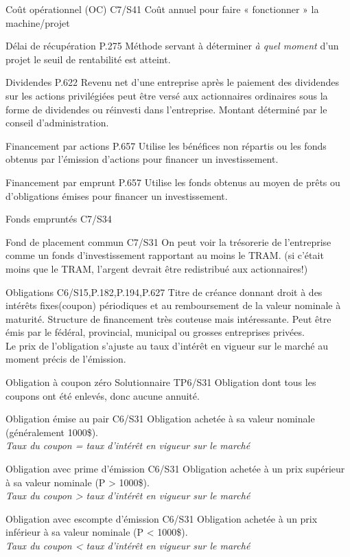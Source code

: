 {\entry
{Coût opérationnel (OC)}
{C7/S41}
{Coût annuel pour faire « fonctionner » la machine/projet}

\entry
{Délai de récupération}
{P.275}
{Méthode servant à déterminer \textit{à quel moment} d'un projet le seuil de rentabilité est atteint.}

\entry
{Dividendes}
{P.622}
{Revenu net d'une entreprise après le paiement des dividendes sur les actions privilégiées peut être versé aux actionnaires ordinaires sous la forme de dividendes ou réinvesti dans l'entreprise. Montant déterminé par le conseil d'administration.}

\entry
{Financement par actions}
{P.657}
{Utilise les bénéfices non répartis ou les fonds obtenus par l'émission d'actions pour financer un investissement.}

\entry
{Financement par emprunt}
{P.657}
{Utilise les fonds obtenus au moyen de prêts ou d'obligations émises pour financer un investissement.}

\entry
{Fonds empruntés}
{C7/S34}
{}

\entry
{Fond de placement commun}
{C7/S31}
{On peut voir la trésorerie de l’entreprise comme un fonds d’investissement rapportant au moins le TRAM. (si c’était moins que le TRAM, l’argent devrait être redistribué aux actionnaires!)}

\entry
{Obligations}
{C6/S15,P.182,P.194,P.627}
{Titre de créance donnant droit à des intérêts fixes(coupon) périodiques et au remboursement de la valeur nominale à maturité. Structure de financement très couteuse mais intéressante. Peut être émis par le fédéral, provincial, municipal ou grosses entreprises privées.\\Le prix de l'obligation s'ajuste au taux d'intérêt en vigueur sur le marché au moment précis de l'émission.}

\entry
{Obligation à coupon zéro}
{Solutionnaire TP6/S31}
{Obligation dont tous les coupons ont été enlevés, donc aucune annuité.}

\entry
{Obligation émise au pair}
{C6/S31}
{Obligation achetée à sa valeur nominale (généralement 1000\$).
\\ \textit{Taux du coupon = taux d'intérêt en vigueur sur le marché}}

\entry
{Obligation avec prime d'émission}
{C6/S31}
{Obligation achetée à un prix supérieur à sa valeur nominale (P > 1000\$).
\\ \textit{Taux du coupon > taux d'intérêt en vigueur sur le marché}}

\entry
{Obligation avec escompte d'émission}
{C6/S31}
{Obligation achetée à un prix inférieur à sa valeur nominale (P < 1000\$).
\\ \textit{Taux du coupon < taux d'intérêt en vigueur sur le marché}}

}
